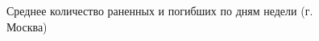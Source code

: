 \documentclass[a4paper, 14pt]{article}
\begin{document}
\begin{figure}[h]
	\caption{Среднее количество раненных и погибших по дням недели (г. Москва)}
\end{figure}










 




\newpage
\end{document}
